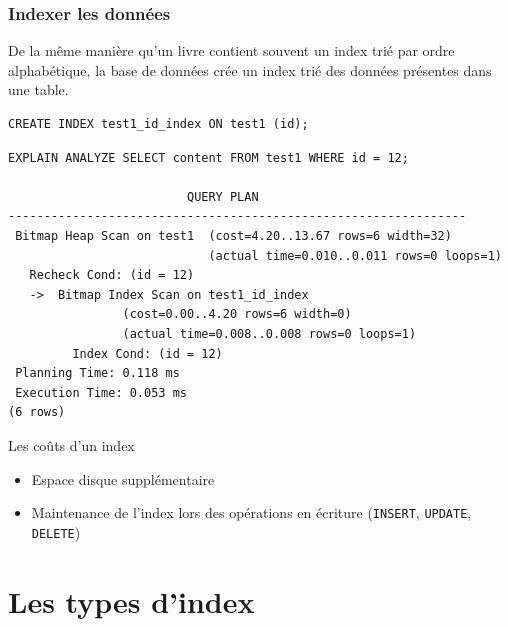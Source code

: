 \documentclass{beamer}
\begin{document}
\begin{frame}[fragile]
    \frametitle{Indexer les données}
    De la même manière qu'un livre contient souvent un index trié par ordre alphabétique, la base de données crée un index trié des données présentes dans une table.
    \begin{verbatim}
CREATE INDEX test1_id_index ON test1 (id);
    \end{verbatim}
    \vspace{-25pt}
    \begin{verbatim}
EXPLAIN ANALYZE SELECT content FROM test1 WHERE id = 12;

                         QUERY PLAN
----------------------------------------------------------------
 Bitmap Heap Scan on test1  (cost=4.20..13.67 rows=6 width=32)
                            (actual time=0.010..0.011 rows=0 loops=1)
   Recheck Cond: (id = 12)
   ->  Bitmap Index Scan on test1_id_index
                (cost=0.00..4.20 rows=6 width=0)
                (actual time=0.008..0.008 rows=0 loops=1)
         Index Cond: (id = 12)
 Planning Time: 0.118 ms
 Execution Time: 0.053 ms
(6 rows)
    \end{verbatim}
\end{frame}

\begin{frame}{Les coûts d'un index}
    \begin{itemize}
        \item Espace disque supplémentaire
        \item Maintenance de l'index lors des opérations en écriture (\texttt{INSERT}, \texttt{UPDATE}, \texttt{DELETE})
    \end{itemize}
\end{frame}

\section{Les types d'index}
\end{document}
